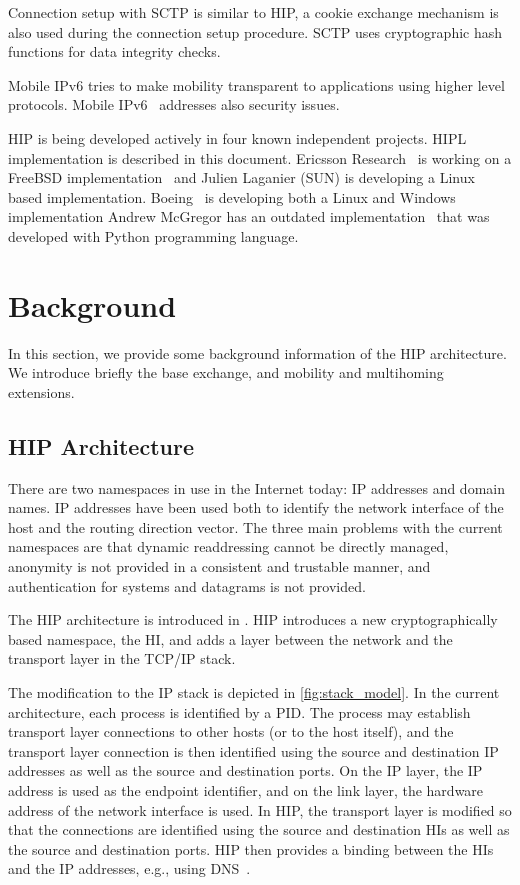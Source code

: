 Connection setup with SCTP is similar to \ac{HIP}, a cookie exchange
mechanism is also used during the connection setup
procedure. \ac{SCTP} uses cryptographic hash functions for data
integrity checks.

Mobile IPv6 tries to make mobility transparent to applications using
higher level protocols. Mobile IPv6~\cite{rfc2002} addresses also
security issues.

\ac{HIP} is being developed actively in four known independent
projects. \ac{HIPL} implementation is described in this document.
Ericsson Research~\cite{ericsson} is working on a FreeBSD
implementation~\cite{netbsd} and Julien Laganier (SUN) is developing a
Linux based implementation. Boeing~\cite{boeing} is developing both a
Linux and Windows implementation Andrew McGregor has an outdated
implementation~\cite{pyhip} that was developed with Python programming
language.

\section{Background}
\label{sec:background}

In this section, we provide some background information of the HIP
architecture. We introduce briefly the base exchange, and mobility and
multihoming extensions.

\subsection{HIP Architecture}

There are two namespaces in use in the Internet today: IP addresses
and domain names.  IP addresses have been used both to identify the
network interface of the host and the routing direction vector.  The
three main problems with the current namespaces are that dynamic
readdressing cannot be directly managed, anonymity is not provided in
a consistent and trustable manner, and authentication for systems and
datagrams is not provided.

The \ac{HIP} architecture is introduced in \cite{hiparch}. \ac{HIP}
introduces a new cryptographically based namespace, the \ac{HI}, and
adds a layer between the network and the transport layer in the TCP/IP
stack.

The modification to the IP stack is depicted in
\autoref{fig:stack_model}. In the current architecture, each process
is identified by a \ac{PID}. The process may establish transport layer
connections to other hosts (or to the host itself), and the transport
layer connection is then identified using the source and destination
IP addresses as well as the source and destination ports. On the IP
layer, the IP address is used as the endpoint identifier, and on the
link layer, the hardware address of the network interface is used. In
\ac{HIP}, the transport layer is modified so that the connections are
identified using the source and destination \acp{HI} as well as the
source and destination ports. \ac{HIP} then provides a binding between
the \acp{HI} and the IP addresses, e.g., using \ac{DNS}~\cite{rfc1034}.


